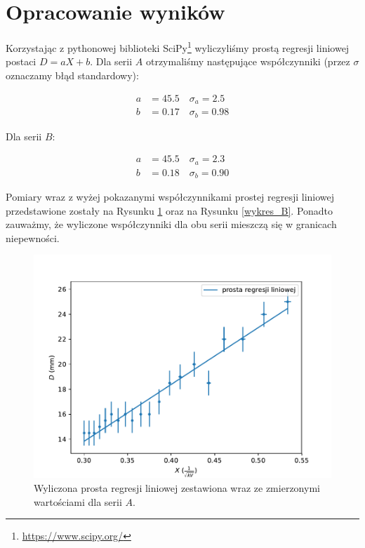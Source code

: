 \documentclass[a4paper]{article}
\begin{document}
\section{Opracowanie wyników}

Korzystając z pythonowej biblioteki SciPy\footnote{\url{https://www.scipy.org/}} wyliczyliśmy prostą regresji liniowej postaci $D = aX + b$.
Dla serii $A$ otrzymaliśmy następujące współczynniki (przez $\sigma$ oznaczamy błąd standardowy):

\begin{align*}
	a &= 45.5 \quad \sigma_a = 2.5 \\
	b &= 0.17 \quad \sigma_b = 0.98
\end{align*}

Dla serii $B$:

\begin{align*}
	a &= 45.5 \quad \sigma_a = 2.3 \\
	b &= 0.18 \quad \sigma_b = 0.90
\end{align*}

Pomiary wraz z wyżej pokazanymi współczynnikami prostej regresji liniowej przedstawione zostały na Rysunku \ref{wykres_A} oraz na Rysunku \ref{wykres_B}.
Ponadto zauważmy, że wyliczone współczynniki dla obu serii mieszczą się w granicach niepewności.

\begin{figure}[h]
\centering
\includegraphics[scale=0.7]{wykres_A.pdf}
\caption{Wyliczona prosta regresji liniowej zestawiona wraz ze zmierzonymi wartościami dla serii $A$.}
\label{wykres_A}
\end{figure}
\end{document}
